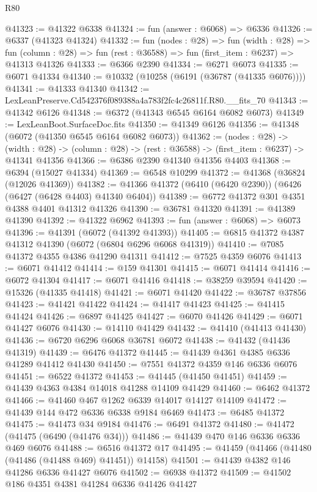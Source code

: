 \begin{lexlean}{R80}
\begin{coremodule}
@41323 := @41322 @6338
@41324 := fun (answer : @6068) => @6336
@41326 := @6337 (@41323 @41324)
@41332 := fun (nodes : @28) =>
  fun (width : @28) =>
  fun (column : @28) => fun (rest : @36588) => fun (first_item : @6237) => @41313 @41326
@41333 := @6366 @2390
@41334 := @6271 @6073
@41335 := @6071 @41334
@41340 := @10332 (@10258 (@6191 (@36787 (@41335 @6076))))
@41341 := @41333 @41340
@41342 := LexLeanPreserve.Cd542376f089388a4a783f2fc4c26811f.R80.__fits_70
@41343 := @41342 @6126
@41348 := @6372 (@41343 @6545 @6164 @6082 @6073)
@41349 := LexLeanBoot.SurfaceDoc.fits
@41350 := @41349 @6126
@41356 := @41348 (@6072 (@41350 @6545 @6164 @6082 @6073))
@41362 := (nodes : @28) ->
  (width : @28) -> (column : @28) -> (rest : @36588) -> (first_item : @6237) -> @41341 @41356
@41366 := @6386 @2390 @41340 @41356 @4403
@41368 := @6394 (@15027 @41334)
@41369 := @6548 @10299
@41372 := @41368 (@36824 (@12026 @41369))
@41382 := @41366 @41372 (@6410 (@6420 @2390)) (@6426 (@6427 (@6428 @4403) @41340 @6404))
@41389 := @6772 @41372 @301 @4351 @4388 @4401 @41312 @41326
@41390 := @36781 @41320
@41391 := @41389 @41390
@41392 := @41322 @6962
@41393 := fun (answer : @6068) => @6073
@41396 := @41391 (@6072 (@41392 @41393))
@41405 := @6815 @41372 @4387 @41312 @41390 (@6072 (@6804 @6296 @6068 @41319))
@41410 := @7085 @41372 @4355 @4386 @41290 @41311
@41412 := @7525 @4359 @6076
@41413 := @6071 @41412
@41414 := @159 @41301
@41415 := @6071 @41414
@41416 := @6072 @41304
@41417 := @6071 @41416
@41418 := @38259 @39594
@41420 := @15326 (@41335 @41418)
@41421 := @6071 @41420
@41422 := @36787 @37856
@41423 := @41421 @41422
@41424 := @41417 @41423
@41425 := @41415 @41424
@41426 := @6897 @41425
@41427 := @6070 @41426
@41429 := @6071 @41427 @6076
@41430 := @14110 @41429
@41432 := @41410 (@41413 @41430)
@41436 := @6720 @6296 @6068 @36781 @6072
@41438 := @41432 (@41436 @41319)
@41439 := @6476 @41372
@41445 := @41439 @4361 @4385 @6336 @41289 @41412 @41430
@41450 := @7551 @41372 @4359 @146 @6336 @6076
@41451 := @6522 @41372
@41453 := @41445 (@41450 @41451)
@41459 := @41439 @4363 @4384 @14018 @41288 @14109 @41429
@41460 := @6462 @41372
@41466 := @41460 @467 @1262 @6339 @14017 @14127 @14109
@41472 := @41439 @144 @472 @6336 @6338 @9184 @6469
@41473 := @6485 @41372
@41475 := @41473 @34 @9184
@41476 := @6491 @41372
@41480 := @41472 (@41475 (@6490 (@41476 @34)))
@41486 := @41439 @470 @146 @6336 @6336 @469 @6076
@41488 := @6516 @41372 @17
@41495 := @41459 (@41466 (@41480 (@41486 (@41488 @469) @41451)) @14158)
@41501 := @41439 @4382 @146 @41286 @6336 @41427 @6076
@41502 := @6938 @41372
@41509 := @41502 @186 @4351 @4381 @41284 @6336 @41426 @41427

\end{coremodule}
\end{lexlean}

